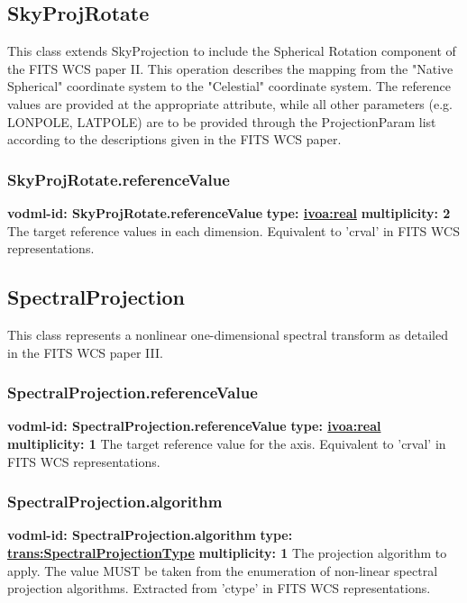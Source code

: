   \subsection{SkyProjRotate}
  \label{sect:SkyProjRotate}
    This class extends SkyProjection to include the Spherical Rotation component of the FITS WCS paper II. This operation describes the mapping from the "Native Spherical" coordinate system to the "Celestial" coordinate system. The reference values are provided at the appropriate attribute, while all other parameters (e.g. LONPOLE, LATPOLE) are to be provided through the ProjectionParam list according to the descriptions given in the FITS WCS paper.

    \subsubsection{SkyProjRotate.referenceValue}
      \textbf{vodml-id: SkyProjRotate.referenceValue} \newline
      \textbf{type: \hyperref[sect:ivoa]{ivoa:real}} \newline
      \textbf{multiplicity: 2} \newline 
      The target reference values in each dimension. Equivalent to 'crval' in FITS WCS representations.

  \subsection{SpectralProjection}
  \label{sect:SpectralProjection}
    This class represents a nonlinear one-dimensional spectral transform as detailed in the FITS WCS paper III.

    \subsubsection{SpectralProjection.referenceValue}
      \textbf{vodml-id: SpectralProjection.referenceValue} \newline
      \textbf{type: \hyperref[sect:ivoa]{ivoa:real}} \newline
      \textbf{multiplicity: 1} \newline 
      The target reference value for the axis. Equivalent to 'crval' in FITS WCS representations.

    \subsubsection{SpectralProjection.algorithm}
      \textbf{vodml-id: SpectralProjection.algorithm} \newline
      \textbf{type: \hyperref[sect:SpectralProjectionType]{trans:SpectralProjectionType}} \newline
      \textbf{multiplicity: 1} \newline 
      The projection algorithm to apply. The value MUST be taken from the enumeration of non-linear spectral projection algorithms. Extracted from 'ctype' in FITS WCS representations.

